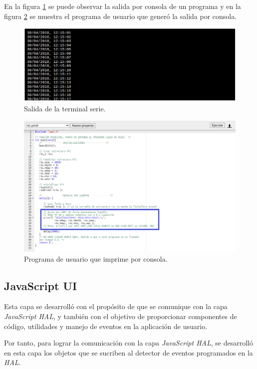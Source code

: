 En la figura \ref{fig:Terminal2} se puede observar la salida por consola de un programa y en la figura \ref{fig:Terminal1} se muestra el programa de usuario que generó la salida por consola.

\begin{figure}[ht]
	\centering
	\includegraphics[scale=.59]{./Figures/Terminal2.png}
	\caption{Salida de la terminal serie.}
	\label{fig:Terminal2}
\end{figure}

\begin{figure}[ht]
	\centering
	\includegraphics[scale=.42]{./Figures/Terminal1.png}
	\caption{Programa de usuario que imprime por consola.}
	\label{fig:Terminal1}
\end{figure}

\subsection{JavaScript UI}

Esta capa se desarrolló con el propósito de que se comunique con la capa \textit{JavaScript HAL}, y también con el objetivo de proporcionar componentes de código, utilidades y manejo de eventos en la aplicación de usuario.

Por tanto, para lograr la comunicación con la capa \textit{JavaScript HAL}, se desarrolló en esta capa los objetos que se sucriben al detector de eventos programados en la \textit{HAL}.

